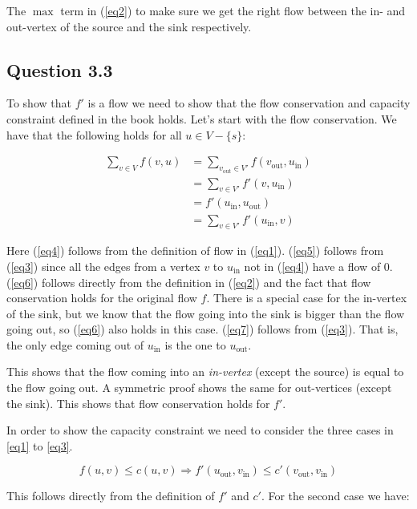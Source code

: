 \documentclass{sig-alternate}
\begin{document}
The $\max$ term in (\ref{eq2}) to make sure we get the right flow between the
in- and out-vertex of the source and the sink respectively.

\subsection*{Question 3.3}

To show that $f'$ is a flow we need to show that the flow conservation and
capacity constraint defined in the book holds. Let's start with the flow
conservation. We have that the following holds for all
$u\in V- \{s\}$:

\begin{align}
    \label{eq4} \sum_{v\in V} f(v,u) &= \sum_{v_{\text{out}} \in V'} f(v_{\text{out}}, u_{\text{in}}) \\
    \label{eq5} &= \sum_{v \in V'} f'(v, u_{\text{in}}) \\
    \label{eq6} &= f'(u_{\text{in}}, u_{\text{out}}) \\
    \label{eq7} &= \sum_{v \in V'} f'(u_{\text{in}}, v)
\end{align}

Here (\ref{eq4}) follows from the definition of flow in (\ref{eq1}).
(\ref{eq5}) follows from (\ref{eq3}) since all the edges from a vertex
$v$ to $u_{\text{in}}$ not in (\ref{eq4}) have a flow of $0$. (\ref{eq6})
follows directly from the definition in (\ref{eq2}) and the fact that flow
conservation holds for the original flow $f$. There is a special case for the
in-vertex of the sink, but we know that the flow going into the sink is bigger
than the flow going out, so (\ref{eq6}) also holds in this case. (\ref{eq7})
follows from (\ref{eq3}). That is, the only edge coming out of $u_{\text{in}}$
is the one to $u_{\text{out}}$.

This shows that the flow coming into an \textit{in-vertex} (except the
source) is equal to the flow going out. A symmetric proof shows the same for
out-vertices (except the sink). This shows that flow conservation holds for
$f'$.

In order to show the capacity constraint we need to consider the three cases
in \autoref{eq1} to \ref{eq3}.

\begin{equation}
    \label{eq8} f(u,v) \leq c(u,v) \Rightarrow f'(u_{\text{out}}, v_{\text{in}}) \leq c'(v_{\text{out}}, v_{\text{in}})
\end{equation}

This follows directly from the definition of $f'$ and $c'$. For the second
case we have:
\end{document}
